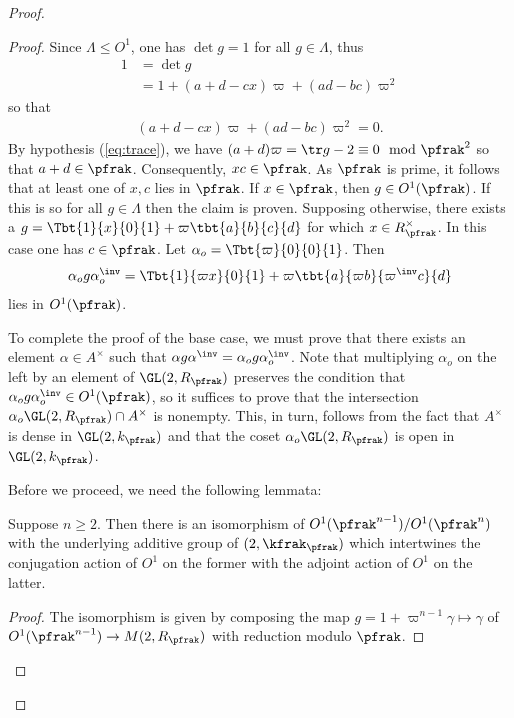 \begin{proof}
\begin{proof}
    Since $\Lambda \leq O^1$, one has $\det g = 1 $ for all $g\in \Lambda$, thus
    \begin{align*}
      1 & = \det g                                     \\
        & = 1 + (a+d - cx ) \varpi + (ad -bc) \varpi^2
    \end{align*}
    so that
    \begin{align}\label{eq:MandarinLeyden}
      (a+d - cx) \varpi + (ad-bc) \varpi^2 =0.
    \end{align}
    By hypothesis (\ref{eq:trace}), we have $(a+d)\varpi = \tr g -2 \equiv 0 \mod \pfrak^2$ so that $a+d \in \pfrak$. Consequently, $xc \in \pfrak$. As $\pfrak$ is prime, it follows that at least one of $x,c$ lies in $\pfrak$. If $x \in \pfrak$, then $g \in O^1(\pfrak)$. If this is so for all $g \in \Lambda$ then the claim is proven. Supposing otherwise, there exists a $ g = \Tbt{1}{x}{0}{1} + \varpi \tbt{a}{b}{c}{d}$ for which $x \in R_\pfrak^\times$. In this case one has $c \in \pfrak$. Let $\alpha_o = \Tbt{\varpi}{0}{0}{1}$. Then
    \begin{align*}
      \alpha_o g\alpha_o^\inv  = \Tbt{1}{\varpi x}{0}{1} + \varpi \tbt{a}{\varpi b}{\varpi^\inv c}{d}
    \end{align*}
    lies in $O^1(\pfrak)$.

    To complete the proof of the base case, we must prove that there exists an element $\alpha \in A^\times $ such that $\alpha g \alpha^\inv =  \alpha_o g \alpha_o^\inv$. Note that multiplying $\alpha_o$ on the left by an element of $\GL(2,R_\pfrak)$ preserves the condition that $\alpha_o g \alpha_o^\inv \in O^1(\pfrak)$, so it suffices to prove that the intersection $\alpha_o \GL(2,R_\pfrak) \cap A^\times $ is nonempty. This, in turn, follows from the fact that $A^\times$ is dense in $\GL(2,k_\pfrak)$ and that the coset  $\alpha_o \GL(2,R_\pfrak)$ is open in $\GL(2,k_\pfrak)$.

    Before we proceed, we need the following lemmata:
    \begin{lemma}\label{lemma:iso}
      Suppose $n\geq 2$. Then there is an isomorphism of $O^1(\pfrak^{n-1}) / O^1(\pfrak^{n})$ with the underlying additive group of $\sl(2,\kfrak_\pfrak)$ which intertwines the conjugation action of $O^1$ on the former with the adjoint action of $O^1$ on the latter.
    \end{lemma}
    \begin{proof}
      The isomorphism is given by composing the map $g = 1 + \varpi^{n-1}\gamma \mapsto \gamma$  of $O^1(\pfrak^{n-1}) \to M(2,R_\pfrak)$ with reduction modulo $\pfrak$.
    \end{proof}


\end{proof}
\end{proof}
